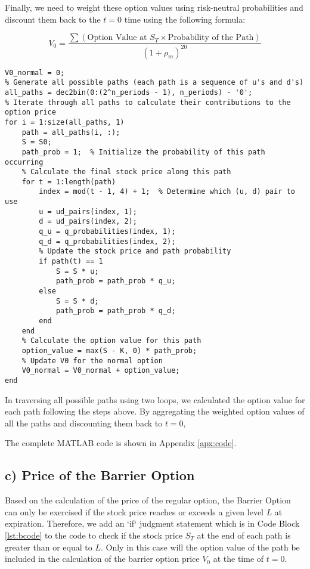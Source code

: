 \documentclass[12pt]{article}
\begin{document}
Finally, we need to weight these option values using risk-neutral probabilities
and discount them back to the \( t=0 \) time using the following formula:

\[
    V_0 = \frac{\sum \left( \text{Option Value at } S_T \times
        \text{Probability of the Path} \right)}{(1+\rho_m)^{20}}
\]

\begin{lstlisting}[label=lst:pathcode,
    caption=Use two for loops to iterate through all possible paths.,
    float]
V0_normal = 0;
% Generate all possible paths (each path is a sequence of u's and d's)
all_paths = dec2bin(0:(2^n_periods - 1), n_periods) - '0';
% Iterate through all paths to calculate their contributions to the option price
for i = 1:size(all_paths, 1)
    path = all_paths(i, :);
    S = S0;
    path_prob = 1;  % Initialize the probability of this path occurring
    % Calculate the final stock price along this path
    for t = 1:length(path)
        index = mod(t - 1, 4) + 1;  % Determine which (u, d) pair to use
        u = ud_pairs(index, 1);
        d = ud_pairs(index, 2);
        q_u = q_probabilities(index, 1);
        q_d = q_probabilities(index, 2);
        % Update the stock price and path probability
        if path(t) == 1
            S = S * u;
            path_prob = path_prob * q_u;
        else
            S = S * d;
            path_prob = path_prob * q_d;
        end
    end
    % Calculate the option value for this path
    option_value = max(S - K, 0) * path_prob;
    % Update V0 for the normal option
    V0_normal = V0_normal + option_value;
end
\end{lstlisting}

In traversing all possible paths using two loops, we calculated the option
value for each path following the steps above. By aggregating the weighted
option values of all the paths and discounting them back to \( t=0 \), \textbf{}

The complete MATLAB code is shown in Appendix \ref{apx:code}.

\subsection{c) Price of the Barrier Option}

Based on the calculation of the price of the regular option, the Barrier Option
can only be exercised if the stock price reaches or exceeds a given level \( L
\) at expiration. Therefore, we add an `if` judgment statement which is in Code
Block \ref{lst:bcode} to the code to
check if the stock price \( S_T \) at the end of each path is greater than or
equal to \( L \). Only in this case will the option value of the path be
included in the calculation of the barrier option price \(V_0 \) at the time of
\(t=0 \).
\end{document}

